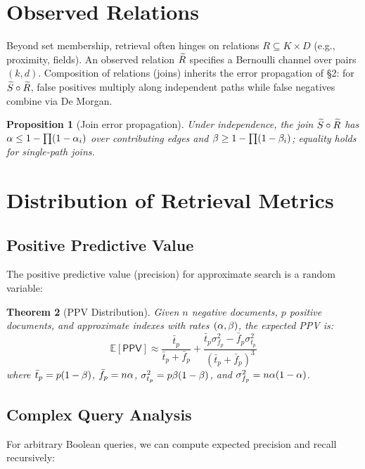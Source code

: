 \documentclass[11pt,final,hidelinks]{article}
\newtheorem{theorem}{Theorem}[section]
\newtheorem{proposition}[theorem]{Proposition}
\newcommand{\PPV}{\mathsf{PPV}}
\begin{document}
\section{Observed Relations}

Beyond set membership, retrieval often hinges on relations $R\subseteq K\times D$ (e.g., proximity, fields). An observed relation $\widetilde{R}$ specifies a Bernoulli channel over pairs $(k,d)$. Composition of relations (joins) inherits the error propagation of \S2: for $\widetilde{S}\circ\widetilde{R}$, false positives multiply along independent paths while false negatives combine via De Morgan.

\begin{proposition}[Join error propagation]
Under independence, the join $\widetilde{S}\circ\widetilde{R}$ has $\alpha\le 1-\prod (1-\alpha_i)$ over contributing edges and $\beta\ge 1-\prod (1-\beta_i)$; equality holds for single-path joins.
\end{proposition}

\section{Distribution of Retrieval Metrics}

\subsection{Positive Predictive Value}

The positive predictive value (precision) for approximate search is a random variable:

\begin{theorem}[PPV Distribution]
Given $n$ negative documents, $p$ positive documents, and approximate indexes with rates $(\alpha, \beta)$, the expected PPV is:
\begin{equation}
\mathbb{E}[\PPV] \approx \frac{\bar{t}_p}{\bar{t}_p + \bar{f}_p} + \frac{\bar{t}_p \sigma_{f_p}^2 - \bar{f}_p \sigma_{t_p}^2}{(\bar{t}_p + \bar{f}_p)^3}
\end{equation}
where $\bar{t}_p = p(1-\beta)$, $\bar{f}_p = n\alpha$, $\sigma_{t_p}^2 = p\beta(1-\beta)$, and $\sigma_{f_p}^2 = n\alpha(1-\alpha)$.
\end{theorem}

\subsection{Complex Query Analysis}

For arbitrary Boolean queries, we can compute expected precision and recall recursively:
\end{document}
